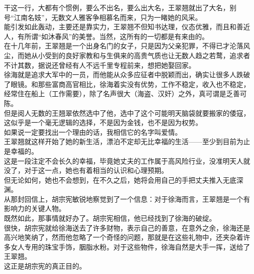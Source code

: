 \begin{multicols}{\theparacolNo}
干这一行，大都有个惯例，要么不出名，要么出大名，王翠翘就出了大名，别号“江南名妓”，无数文人雅客争相慕名而来，只为一睹她的风采。\\

能引发如此轰动，主要还是靠实力，王翠翘不但知书达理，仪态优雅，而且和善近人，有所谓“如沐春风”的美誉。当然，这所有的一切都是有来由的。\\

在十几年前，王翠翘是一个出身名门的女子，只是因为父亲犯罪，不得已才沦落风尘，而她从小受到的良好家教和与生俱来的高贵气质也让无数人趋之若鹜，追求者不计其数，据说还曾经有人不远千里专程前来，想把她娶回家。\\

徐海就是追求大军中的一员，而他能从众多应征者中脱颖而出，确实让很多人跌破了眼镜。和那些富商高官相比，徐海着实没有优势，工作不稳定，收入也不稳定，经常住在船上（工作需要），除了名声很大（海盗、汉奸）之外，真可谓是乏善可陈。\\

但是阅人无数的王翘翠依然选中了他，选中了这个可能明天脑袋就要搬家的倭寇，这似乎是一个毫无逻辑的选择，不是因为金钱，也不是因为权势。\\

如果说一定要找出一个理由的话，我相信它的名字叫爱情。\\

王翠翘就这样开始了她的新生活，漂泊不定却无比幸福的生活——至少到目前为止是幸福的。\\

这是一段注定不会长久的幸福，毕竟她丈夫的工作属于高风险行业，没准明天人就没了，对于这一点，她也有着相当的认识和心理预期。\\

但无论如何，她也不会想到，在不久之后，她将会用自己的手把丈夫推入无底深渊。\\

从那封回信上，胡宗宪敏锐地察觉到了一个信息：对于徐海而言，王翠翘是一个有影响力的关键人物。\\

既然如此，那事情就好办了。胡宗宪相信，他已经找到了徐海的破绽。\\

很快，胡宗宪就给徐海送去了许多财物，表示自己的善意，在意外之余，徐海还是高兴地笑纳了，然而他忽略了一个奇怪的问题，那就是在这些礼物中，还夹杂着许多女人专用的珠宝手饰，胭脂水粉。对于这些物件，徐海自然是大手一挥，送给了王翠翘。\\

这正是胡宗宪的真正目的。\\


\end{multicols}
